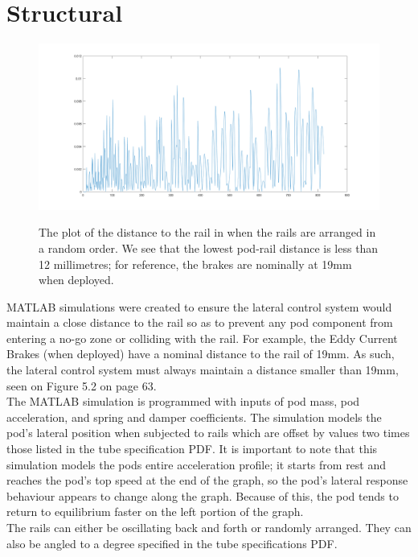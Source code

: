 \documentclass[main.tex]{subfiles}
\begin{document}
    \section{Structural}
    \begin{figure}
    	\centering
        \includegraphics[width=\linewidth]{images/RandDistToRail}
        \label{fig:RandDistToRail}
        \caption{The plot of the distance to the rail in when the rails are arranged in a random order. We see that the lowest pod-rail distance is less than 12 millimetres; for reference, the brakes are nominally at 19mm when deployed.}
    \end{figure}
    MATLAB simulations were created to ensure the lateral control system would maintain a close distance to the rail so as to prevent any pod component from entering a no-go zone or colliding with the rail. For example, the Eddy Current Brakes (when deployed) have a nominal distance to the rail of 19mm. As such, the lateral control system must always maintain a distance smaller than 19mm, seen on Figure 5.2 on page 63.\\
    The MATLAB simulation is programmed with inputs of pod mass, pod acceleration, and spring and damper coefficients. The simulation models the pod's lateral position when subjected to rails which are offset by values two times those listed in the tube specification PDF. It is important to note that this simulation models the pods entire acceleration profile; it starts from rest and reaches the pod's top speed at the end of the graph, so the pod's lateral response behaviour appears to change along the graph. Because of this, the pod tends to return to equilibrium faster on the left portion of the graph. \\
    The rails can either be oscillating back and forth or randomly arranged. They can also be angled to a degree specified in the tube specifications PDF.\\
\end{document}
